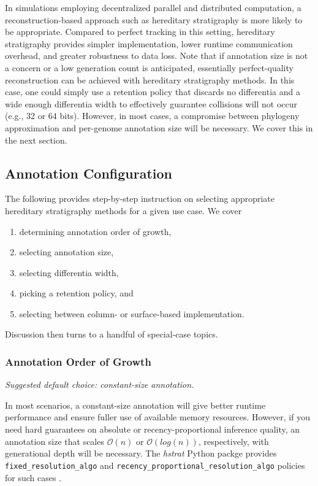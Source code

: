 In simulations employing decentralized parallel and distributed computation, a reconstruction-based approach such as hereditary stratigraphy is more likely to be appropriate.
Compared to perfect tracking in this setting, hereditary stratigraphy provides simpler implementation, lower runtime communication overhead, and greater robustness to data loss.
Note that if annotation size is not a concern or a low generation count is anticipated, essentially perfect-quality reconstruction can be achieved with hereditary stratigraphy methods.
In this case, one could simply use a retention policy that discards no differentia and a wide enough differentia width to effectively guarantee collisions will not occur (e.g., 32 or 64 bits).
However, in most cases, a compromise between phylogeny approximation and per-genome annotation size will be necessary.
We cover this in the next section.

\subsection{Annotation Configuration}

The following provides step-by-step instruction on selecting appropriate hereditary stratigraphy methods for a given use case.
We cover
\begin{enumerate}
\item determining annotation order of growth,
\item selecting annotation size,
\item selecting differentia width,
\item picking a retention policy, and
\item selecting between column- or surface-based implementation.
\end{enumerate}

Discussion then turns to a handful of special-case topics.

\subsubsection{Annotation Order of Growth}
\textit{Suggested default choice: constant-size annotation.}

In most scenarios, a constant-size annotation will give better runtime performance and ensure fuller use of available memory resources.
However, if you need hard guarantees on absolute or recency-proportional inference quality, an annotation size that scales $\mathcal{O}(n)$ or $\mathcal{O}(log(n))$, respectively, with generational depth will be necessary.
The \textit{hstrat} Python packge provides \texttt{fixed\_resolution\_algo} and  \texttt{recency\_proportional\_resolution\_algo} policies for such cases \citep{moreno2022hstrat}.

